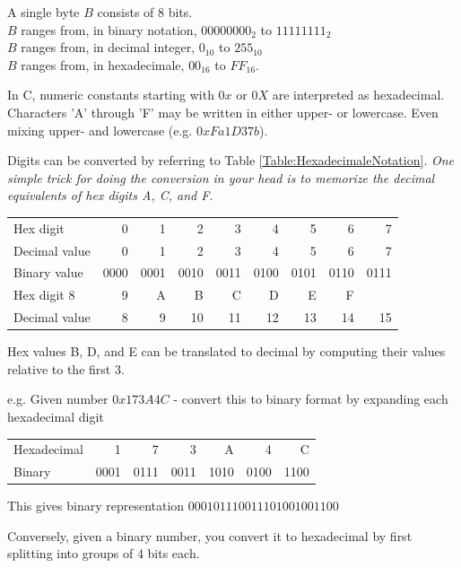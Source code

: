 \documentclass[10pt]{amsart}
\begin{document}
\begin{multicols*}{2}
A single byte $B$ consists of 8 bits. \\
$B$ ranges from, in binary notation, $00000000_2$ to $11111111_2$ \\
$B$ ranges from, in decimal integer, $0_{10}$ to $255_{10}$ \\
$B$ ranges from, in hexadecimale, $00_{16}$ to ${FF}_{16}$. 

In C, numeric constants starting with $0x$ or $0X$ are interpreted as hexadecimal. Characters 'A' through 'F' may be written in either upper- or lowercase. Even mixing upper- and lowercase (e.g. $0xFa1D37b$).

Digits can be converted by referring to Table \ref{Table:HexadecimaleNotation}. \emph{One simple trick for doing the conversion in your head is to memorize the decimal equivalents of hex digits A, C, and F}.

\begin{center}
	\label{Table:HexadecimaleNotation}
	\begin{tabular}{ l | r | r | r | r | r | r | r | r | }
		\hline
		Hex digit & 0 & 1 & 2 & 3 & 4 & 5 & 6 & 7 \\
		Decimal value & 0 & 1 & 2 & 3 & 4 & 5 & 6 & 7 \\
		Binary value & 0000 & 0001 & 0010 & 0011 & 0100 & 0101 & 0110 & 0111 \\
		Hex digit 8 & 9 & A & B & C & D & E & F \\
		Decimal value & 8 & 9 & 10 & 11 & 12 & 13 & 14 & 15 \\
		\hline
	\end{tabular}
\end{center}

Hex values B, D, and E can be translated to decimal by computing their values relative to the first 3.

e.g. Given number $0x173A4C$ - convert this to binary format by expanding each hexadecimal digit

\begin{center}
	\begin{tabular}{ l | r | r | r | r | r | r }
		Hexadecimal & 1 & 7 & 3 & A & 4 & C \\
		Binary & 0001 & 0111& 0011 & 1010 & 0100 & 1100 \\
	\end{tabular}
\end{center}

This gives binary representation $000101110011101001001100$

Conversely, given a binary number, you convert it to hexadecimal by first splitting into groups of 4 bits each.


\end{multicols*}
\end{document}
